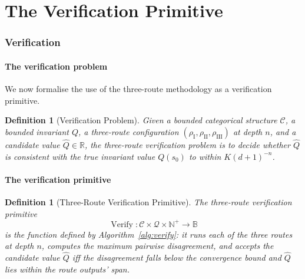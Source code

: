 \documentclass[twocolumn,11pt,a4paper]{article}
\newtheorem{definition}[theorem]{Definition}
\DeclareMathOperator{\Verify}{Verify}
\newcommand{\Real}{\mathbb{R}}
\newcommand{\Natural}{\mathbb{N}}
\newcommand{\Bool}{\mathbb{B}}
\newcommand{\Inv}{Q}
\newcommand{\InvSpace}{\mathcal{Q}}
\newcommand{\RouteI}{\rho_{\mathrm{I}}}
\newcommand{\RouteII}{\rho_{\mathrm{II}}}
\newcommand{\RouteIII}{\rho_{\mathrm{III}}}
\newcommand{\Depth}{n}
\newcommand{\Dim}{d}
\newcommand{\Tolb}{K}
\begin{document}
\part{The Verification Primitive}

\section{Verification}
\label{sec:verification}

\subsection{The verification problem}

We now formalise the use of the three-route methodology as a verification primitive.

\begin{definition}[Verification Problem]
\label{def:verification-problem}
Given a bounded categorical structure $\mathcal{C}$, a bounded invariant $\Inv$, a three-route configuration $(\RouteI, \RouteII, \RouteIII)$ at depth $\Depth$, and a candidate value $\hat\Inv \in \Real$, the \emph{three-route verification problem} is to decide whether $\hat\Inv$ is consistent with the true invariant value $\Inv(s_0)$ to within $\Tolb(\Dim+1)^{-\Depth}$.
\end{definition}

\subsection{The verification primitive}

\begin{definition}[Three-Route Verification Primitive]
\label{def:verify}
The \emph{three-route verification primitive}
\[
\Verify : \mathcal{C} \times \InvSpace \times \Natural^+ \to \Bool
\]
is the function defined by Algorithm~\ref{alg:verify}: it runs each of the three routes at depth $\Depth$, computes the maximum pairwise disagreement, and accepts the candidate value $\hat\Inv$ iff the disagreement falls below the convergence bound and $\hat\Inv$ lies within the route outputs' span.
\end{definition}
\end{document}
